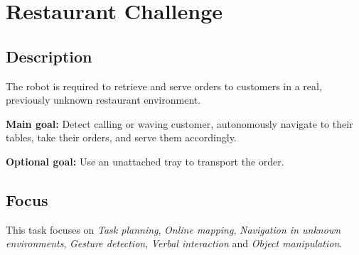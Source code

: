 \section{Restaurant Challenge}\label{test:restaurant}

\subsection*{Description}

The robot is required to retrieve and serve orders to customers in a real, previously unknown restaurant environment.

\textbf{Main goal:}
	Detect calling or waving customer, autonomously navigate to their tables, take their orders, and serve them accordingly.
	
\textbf{Optional goal:}
	Use an unattached tray to transport the order.


\subsection*{Focus}
This task focuses on
\emph{Task planning}, \emph{Online mapping}, \emph{Navigation in unknown  environments}, \emph{Gesture detection}, \emph{Verbal interaction} and \emph{Object manipulation}.	


